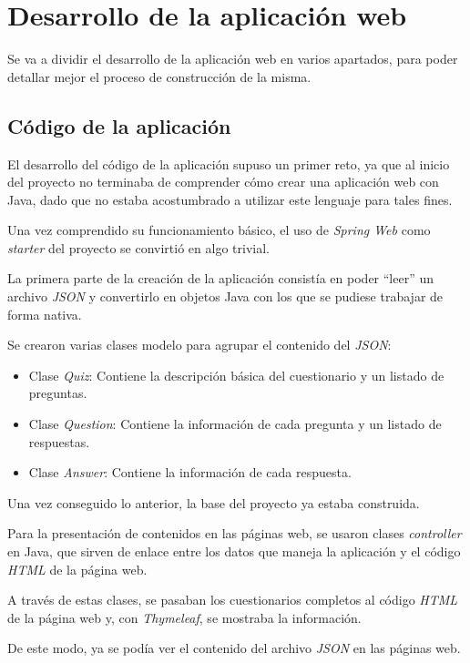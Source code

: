 \section{Desarrollo de la aplicación web}

Se va a dividir el desarrollo de la aplicación web en varios apartados, para poder detallar mejor el proceso de construcción de la misma.

\subsection{Código de la aplicación}

El desarrollo del código de la aplicación supuso un primer reto, ya que al inicio del proyecto no terminaba de comprender cómo crear una aplicación web con Java, dado que no estaba acostumbrado a utilizar este lenguaje para tales fines.

Una vez comprendido su funcionamiento básico, el uso de \textit{Spring Web} como \textit{starter} del proyecto se convirtió en algo trivial.

La primera parte de la creación de la aplicación consistía en poder ``leer'' un archivo \textit{JSON} y convertirlo en objetos Java con los que se pudiese trabajar de forma nativa.

Se crearon varias clases modelo para agrupar el contenido del \textit{JSON}:

 \begin{itemize}
	\item Clase \textit{Quiz}: Contiene la descripción básica del cuestionario y un listado de preguntas.
	\item Clase \textit{Question}: Contiene la información de cada pregunta y un listado de respuestas.
	\item Clase \textit{Answer}: Contiene la información de cada respuesta.
\end{itemize}

Una vez conseguido lo anterior, la base del proyecto ya estaba construida.

Para la presentación de contenidos en las páginas web, se usaron clases \textit{controller} en Java, que sirven de enlace entre los datos que maneja la aplicación y el código \textit{HTML} de la página web.

A través de estas clases, se pasaban los cuestionarios completos al código \textit{HTML} de la página web y, con \textit{Thymeleaf}, se mostraba la información.

De este modo, ya se podía ver el contenido del archivo \textit{JSON} en las páginas web.

